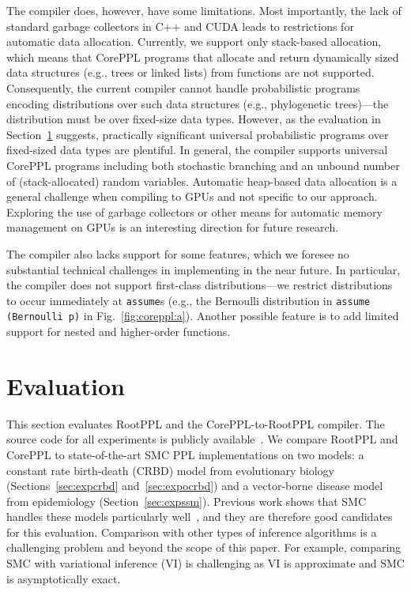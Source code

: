\documentclass[runningheads]{llncs}
\newcommand{\clstinline}{\lstinline[language=CorePPL]}
\begin{document}
The compiler does, however, have some limitations.
Most importantly, the lack of standard garbage collectors in C++ and CUDA leads to restrictions for automatic data allocation.
Currently, we support only stack-based allocation, which means that CorePPL programs that allocate and return dynamically sized data structures (e.g., trees or linked lists) from functions are not supported.
Consequently, the current compiler cannot handle probabilistic programs encoding distributions over such data structures (e.g., phylogenetic trees)---the distribution must be over fixed-size data types.
However, as the evaluation in Section~\ref{sec:eval} suggests, practically significant universal probabilistic programs over fixed-sized data types are plentiful.
In general, the compiler supports universal CorePPL programs including both stochastic branching and an unbound number of (stack-allocated) random variables.
Automatic heap-based data allocation is a general challenge when compiling to GPUs and not specific to our approach.
Exploring the use of garbage collectors or other means for automatic memory management on GPUs is an interesting direction for future research.

The compiler also lacks support for some features, which we foresee no substantial technical challenges in implementing in the near future.
In particular, the compiler does not support first-class distributions---we restrict distributions to occur immediately at \clstinline!assume!s (e.g., the Bernoulli distribution in \clstinline!assume (Bernoulli p)! in Fig.~\ref{fig:coreppl:a}).
Another possible feature is to add limited support for nested and higher-order functions.

\section{Evaluation}\label{sec:eval}
This section evaluates RootPPL and the CorePPL-to-RootPPL compiler.
The source code for all experiments is publicly available~\cite{lunden2022compilingartifact}.
We compare RootPPL and CorePPL to state-of-the-art SMC PPL implementations on two models: a constant rate birth-death (CRBD) model from evolutionary biology (Sections~\ref{sec:expcrbd} and~\ref{sec:expocrbd}) and a vector-borne disease model from epidemiology (Section~\ref{sec:expssm}).
Previous work shows that SMC handles these models particularly well~\cite{ronquist2021universal,murray2018delayed}, and they are therefore good candidates for this evaluation.
Comparison with other types of inference algorithms is a challenging problem and beyond the scope of this paper.
For example, comparing SMC with variational inference (VI) is challenging as VI is approximate and SMC is asymptotically exact.
\end{document}
